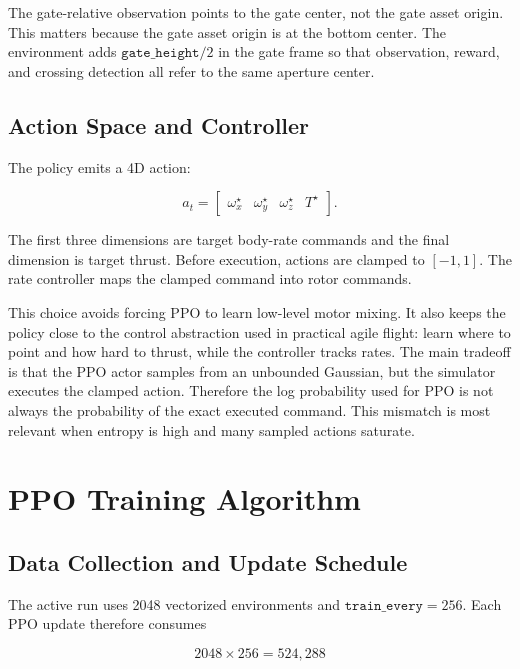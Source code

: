 \documentclass[11pt]{article}
\begin{document}
The gate-relative observation points to the gate center, not the gate asset
origin. This matters because the gate asset origin is at the bottom center. The
environment adds \(\texttt{gate\_height}/2\) in the gate frame so that
observation, reward, and crossing detection all refer to the same aperture
center.

\subsection{Action Space and Controller}

The policy emits a 4D action:

\begin{equation}
a_t =
\begin{bmatrix}
\omega_x^\star & \omega_y^\star & \omega_z^\star & T^\star
\end{bmatrix}.
\end{equation}

The first three dimensions are target body-rate commands and the final
dimension is target thrust. Before execution, actions are clamped to
\([-1,1]\). The rate controller maps the clamped command into rotor commands.

This choice avoids forcing PPO to learn low-level motor mixing. It also keeps
the policy close to the control abstraction used in practical agile flight:
learn where to point and how hard to thrust, while the controller tracks rates.
The main tradeoff is that the PPO actor samples from an unbounded Gaussian, but
the simulator executes the clamped action. Therefore the log probability used
for PPO is not always the probability of the exact executed command. This
mismatch is most relevant when entropy is high and many sampled actions saturate.

\section{PPO Training Algorithm}

\subsection{Data Collection and Update Schedule}

The active run uses 2048 vectorized environments and
\(\texttt{train\_every}=256\). Each PPO update therefore consumes

\begin{equation}
2048 \times 256 = 524{,}288
\end{equation}
\end{document}
